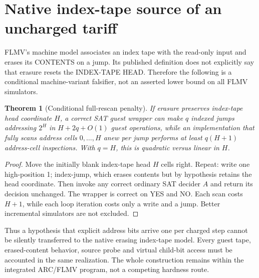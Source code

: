\documentclass[10pt]{article}
\newtheorem{theorem}{Theorem}
\begin{document}
\section{Native index-tape source of an uncharged tariff}
FLMV's machine model associates an index tape with the read-only input and erases its CONTENTS on a jump. Its published definition does not explicitly say that erasure resets the INDEX-TAPE HEAD. Therefore the following is a conditional machine-variant falsifier, not an asserted lower bound on all FLMV simulators.
\begin{theorem}[Conditional full-rescan penalty]
If erasure preserves index-tape head coordinate $H$, a correct SAT guest wrapper can make $q$ indexed jumps addressing $2^H$ in $H+2q+O(1)$ guest operations, while an implementation that fully scans address cells $0,\ldots,H$ anew per jump performs at least $q(H+1)$ address-cell inspections. With $q=H$, this is quadratic versus linear in $H$.
\end{theorem}
\begin{proof}
Move the initially blank index-tape head $H$ cells right. Repeat: write one high-position 1; index-jump, which erases contents but by hypothesis retains the head coordinate. Then invoke any correct ordinary SAT decider $A$ and return its decision unchanged. The wrapper is correct on YES and NO. Each scan costs $H+1$, while each loop iteration costs only a write and a jump. Better incremental simulators are not excluded.
\end{proof}
Thus a hypothesis that explicit address bits arrive one per charged step cannot be silently transferred to the native erasing index-tape model. Every guest tape, erased-content behavior, source probe and virtual child-bit access must be accounted in the same realization. The whole construction remains within the integrated ARC/FLMV program, not a competing hardness route.
\end{document}
